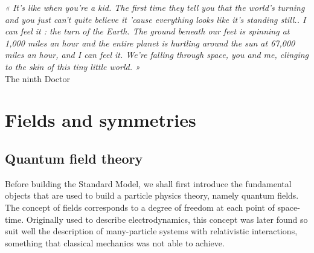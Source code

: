 %
%

\setcounter{mtc}{3}
\vspace*{-0.7cm}
\begin{center}
\begin{minipage}{0.95\textwidth}
\emph{« It’s like when you’re a kid. The first time they tell you that the world’s turning and you just can’t
quite believe it ’cause everything looks like it’s standing still.. I can feel it : the turn of the Earth.
The ground beneath our feet is spinning at 1,000 miles an hour and the entire planet is hurtling around
the sun at 67,000 miles an hour, and I can feel it. We’re falling through space, you and me, clinging to
the skin of this tiny little world. »}\\
\hspace*{0.75\textwidth} The ninth Doctor
\end{minipage}
\end{center}
\minitoc
\newpage


    \section{Fields and symmetries}

        \subsection{Quantum field theory}

    Before building the Standard Model, we shall first introduce the fundamental objects
    that are used to build a particle physics theory, namely quantum fields. The concept
    of fields corresponds to a degree of freedom at each point of space-time. Originally
    used to describe electrodynamics, this concept was later found so suit well the
    description of many-particle systems with relativistic interactions, something that
    classical mechanics was not able to achieve.


